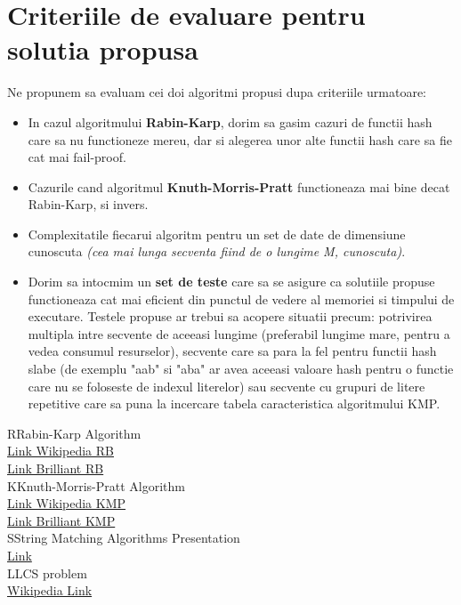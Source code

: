 \documentclass[runningheads]{llncs}
\begin{document}
 \pagebreak
 \section{\Large{Criteriile de evaluare pentru solutia propusa}}
\par Ne propunem sa evaluam cei doi algoritmi propusi dupa criteriile urmatoare:
\begin{itemize}
	\item In cazul algoritmului \textbf{Rabin-Karp}, dorim sa gasim cazuri de functii hash care sa nu functioneze mereu, dar si alegerea unor alte functii hash care sa fie cat mai fail-proof.
	\item Cazurile cand algoritmul \textbf{Knuth-Morris-Pratt} functioneaza mai bine decat Rabin-Karp, si invers.
	\item Complexitatile fiecarui algoritm pentru un set de date de dimensiune cunoscuta \textit{(cea mai lunga secventa fiind de o lungime M, cunoscuta)}.
	\item Dorim sa intocmim un \textbf{set de teste} care sa se asigure ca solutiile propuse functioneaza cat mai eficient din punctul de vedere al memoriei si timpului de executare. Testele propuse ar trebui sa acopere situatii precum: potrivirea multipla intre secvente de aceeasi lungime (preferabil lungime mare, pentru a vedea consumul resurselor), secvente care sa para la fel pentru functii hash slabe (de exemplu "aab" si "aba" ar avea aceeasi valoare hash pentru o functie care nu se foloseste de indexul literelor) sau secvente cu grupuri de litere repetitive care sa puna la incercare tabela caracteristica algoritmului KMP.
\end{itemize}

\bigbreak
\begin{thebibliography}{8}
\bibitem RRabin-Karp  Algorithm \\
\href {https://en.wikipedia.org/wiki/Rabin%E2%80%93Karp_algorithm} {Link Wikipedia RB} \\
\href{https://brilliant.org/wiki/rabin-karp-algorithm/#_=_} {Link Brilliant RB} \\

\bibitem KKnuth-Morris-Pratt Algorithm \\
\href {https://en.wikipedia.org/wiki/Knuth%E2%80%93Morris%E2%80%93Pratt_algorithm} {Link Wikipedia KMP} \\
\href {https://brilliant.org/wiki/knuth-morris-pratt-algorithm/} {Link Brilliant KMP} \\

\bibitem SString Matching Algorithms Presentation \\
\href{https://www.cs.auckland.ac.nz/courses/compsci369s1c/lectures/GG-notes/CS369-StringAlgs.pdf} {Link} \\

\bibitem LLCS problem \\
\href{https://en.wikipedia.org/wiki/Longest_common_subsequence_problem#Reduce_strings_to_hashes}{Wikipedia Link}\\

\end{thebibliography}
\end{document}
